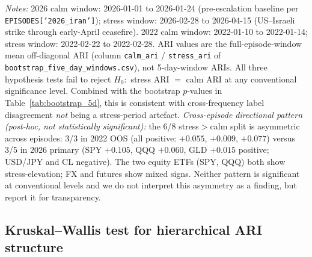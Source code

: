 \documentclass[preprint,12pt,authoryear]{elsarticle}
\begin{document}
\begin{table}[H]
\begin{tabular}{llccc}
\bottomrule
\end{tabular}
\par\medskip
{\footnotesize\justifying
\textit{Notes:} 2026 calm window: 2026-01-01 to 2026-01-24 (pre-escalation baseline per \texttt{EPISODES['2026\_iran']}); stress window: 2026-02-28 to 2026-04-15 (US--Israeli strike through early-April ceasefire). 2022 calm window: 2022-01-10 to 2022-01-14; stress window: 2022-02-22 to 2022-02-28. ARI values are the full-episode-window mean off-diagonal ARI (column \texttt{calm\_ari} / \texttt{stress\_ari} of \texttt{bootstrap\_five\_day\_windows.csv}), not 5-day-window ARIs. All three hypothesis tests fail to reject $H_0:$ stress ARI $=$ calm ARI at any conventional significance level. Combined with the bootstrap $p$-values in Table~\ref{tab:bootstrap_5d}, this is consistent with cross-frequency label disagreement \emph{not} being a stress-period artefact. \emph{Cross-episode directional pattern (post-hoc, not statistically significant):} the 6/8 stress$>$calm split is asymmetric across episodes: 3/3 in 2022 OOS (all positive: $+0.055$, $+0.009$, $+0.077$) versus 3/5 in 2026 primary (SPY $+0.105$, QQQ $+0.060$, GLD $+0.015$ positive; USD/JPY and CL negative). The two equity ETFs (SPY, QQQ) both show stress-elevation; FX and futures show mixed signs. Neither pattern is significant at conventional levels and we do not interpret this asymmetry as a finding, but report it for transparency.
\par}
\end{table}

\subsection{Kruskal--Wallis test for hierarchical ARI structure}\label{app:kw_test}
\end{document}
